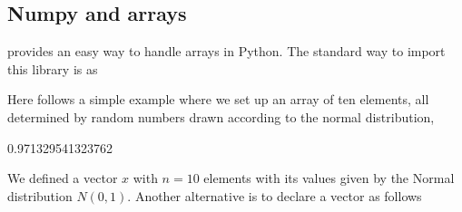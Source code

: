 \documentclass[letterpaper,10pt,english]{sphinxmanual}
\begin{document}
\subsection{Numpy and arrays}
\label{\detokenize{chapter2:numpy-and-arrays}}
 provides an easy way to handle arrays in Python. The standard way to import this library is as

\begin{sphinxVerbatim}[commandchars=\\\{\}]
   
\end{sphinxVerbatim}

Here follows a simple example where we set up an array of ten elements, all determined by random numbers drawn according to the normal distribution,

\begin{sphinxVerbatim}[commandchars=\\\{\}]
  
  
\PYG{p}{[}\PYG{p}{]}
\end{sphinxVerbatim}

\begin{sphinxVerbatim}
0.971329541323762
\end{sphinxVerbatim}

We defined a vector \(x\) with \(n=10\) elements with its values given by the Normal distribution \(N(0,1)\).
Another alternative is to declare a vector as follows

\begin{sphinxVerbatim}[commandchars=\\\{\}]
   
  \PYG{p}{[}  \PYG{p}{]}
\end{sphinxVerbatim}

\begin{sphinxVerbatim}[commandchars=\\\{\}]
[1 2 3]
\end{sphinxVerbatim}
\end{document}

